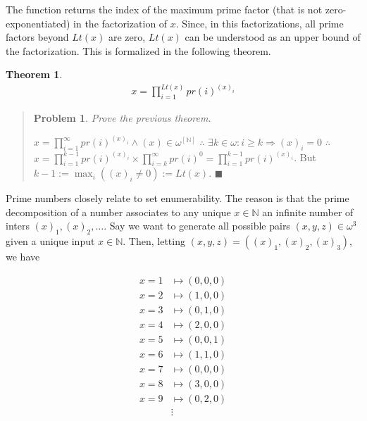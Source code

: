 \documentclass[a4paper, 12pt]{article}
\newtheorem{problem}{Problem}
\newtheorem{theorem}{Theorem}
\newtheorem{problem}{Problem}
\newtheorem{theorem}{Theorem}
\begin{document}
The function returns the index of the maximum prime factor (that is not
zero-exponentiated) in the factorization of $x$. Since, in this factorizations,
all prime factors beyond $Lt(x)$ are zero, $Lt(x)$ can be understood as an
upper bound of the factorization. This is formalized in the following theorem.

\begin{theorem}
    \begin{align*}
        x = \prod_{i=1}^{Lt(x)}  pr(i)^{(x)_i}
    \end{align*}
\end{theorem}


\small
\begin{quote}


\begin{problem}
    Prove the previous theorem.
\end{problem}

$x = \prod_{i=1}^{\infty} pr(i)^{(x)_i} \land (x) \in
\omega^{[\mathbb{N}]}$ $\therefore$  $\exists k \in \omega :  i
\geq k \Rightarrow (x)_i =
0$ $\therefore $ $x = \prod_{i=1}^{k - 1} pr(i)^{(x)_i} \times \prod_{i=k}^{\infty}
pr(i)^{0} = \prod_{i=1}^{k-1} pr(i)^{(x)_i} $. But $k - 1 := \max_{i} \left(
(x)_i \neq 0 \right) := Lt(x)$. $\blacksquare$


\end{quote}
\normalsize

Prime numbers closely relate to set enumerability. The reason is that the prime
decomposition of a number associates to any unique $x \in \mathbb{N}$ an
infinite number of inters $(x)_1, (x)_2, \ldots$. Say we want to generate
all possible pairs $(x, y, z) \in \omega^3$ given a unique input $x \in
\mathbb{N}$. Then, letting $(x, y, z) = \left( (x)_1, (x)_2, (x)_3 \right) $, we
have 

\begin{align*}
    x = 1 &\mapsto (0, 0, 0)\\ 
    x = 2 &\mapsto (1, 0, 0)\\
    x = 3 &\mapsto (0, 1, 0)\\
    x = 4 &\mapsto (2, 0, 0)\\
    x = 5 &\mapsto (0, 0, 1)\\
    x = 6 &\mapsto (1, 1, 0)\\ 
    x = 7 &\mapsto (0, 0, 0)\\
    x = 8 &\mapsto (3, 0, 0)\\
    x = 9 &\mapsto (0, 2, 0)\\ 
      &\vdots
\end{align*}
\end{document}
